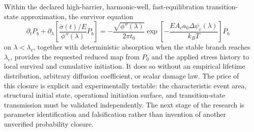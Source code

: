 \documentclass[11pt]{article}
\begin{document}
Within the declared high-barrier, harmonic-well, fast-equilibration transition-state approximation, the survivor equation
\begin{equation}
\partial_tP_b
+\partial_\lambda\left[
\frac{\dot\sigma(t)/E}{\phi''(\lambda)}P_b
\right]
=-
\frac{\sqrt{\phi''(\lambda)}}{2\pi t_0}
\exp\left[-\frac{EA_ca_0\Delta\psi_c(\lambda)}{k_BT}\right]P_b
\end{equation}
on $\lambda<\lambda_c$, together with deterministic absorption when the stable branch reaches $\lambda_c$, provides the requested reduced map from $P_0$ and the applied stress history to local survival and cumulative initiation. It does so without an empirical lifetime distribution, arbitrary diffusion coefficient, or scalar damage law. The price of this closure is explicit and experimentally testable: the characteristic event area, structural initial state, operational initiation surface, and transition-state transmission must be validated independently. The next stage of the research is parameter identification and falsification rather than invention of another unverified probability closure.

\appendix

\end{document}
